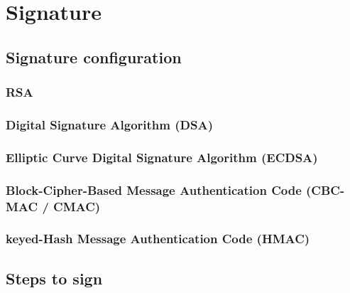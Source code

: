 \chapter{Signature}

\section{Signature configuration}
\subsection{RSA}
\subsection{Digital Signature Algorithm (DSA)}
\subsection{Elliptic Curve Digital Signature Algorithm (ECDSA)}
\subsection{Block-Cipher-Based Message Authentication Code (CBC-MAC / CMAC)}
\subsection{keyed-Hash Message Authentication Code (HMAC)}


\section{Steps to sign}